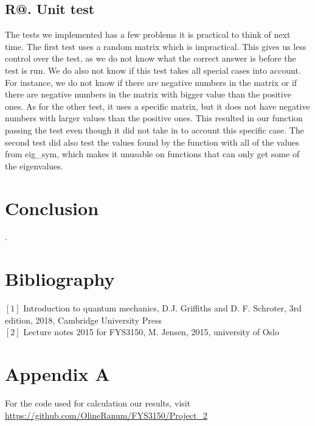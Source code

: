 \documentclass[%
reprint,
amsmath, 
amssymb, 
aps,]{revtex4-1}
\makeatletter
\newcommand*{\rom}[1]{\expandafter\@slowromancap\romannumeral #1@}
\makeatother
\begin{document}
		\subsection*{R\rom{5}. Unit test}
The tests we implemented has a few problems it is practical to think of next time. The first test uses a random matrix which is impractical. This gives us less control over the test, as we do not know what the correct answer is before the test is run. We do also not know if this test takes all special cases into account. For instance, we do not know if there are negative numbers in the matrix or if there are negative numbers in the matrix with bigger value than the positive ones. As for the other test, it uses a specific matrix, but it does not have negative numbers with larger values than the positive ones. This resulted in our function passing the test even though it did not take in to account this specific case. The second test did also test the values found by the function with all of the values from eig\_sym, which makes it unusable on functions that can only get some of the eigenvalues.

	\section*{Conclusion}


\newpage .
\newpage 
\onecolumngrid
\section*{Bibliography}
\noindent $[1]$ Introduction to quantum mechanics, D.J. Griffiths and D. F. Schroter, 3rd edition, 2018, Cambridge University Press\\ 
$[2]$ Lecture notes 2015 for FYS3150, M. Jensen, 2015, university of Oslo
\section*{Appendix A}
For the code used for calculation our results, visit
\url{https://github.com/OlineRanum/FYS3150/Project_2}
\end{document}
